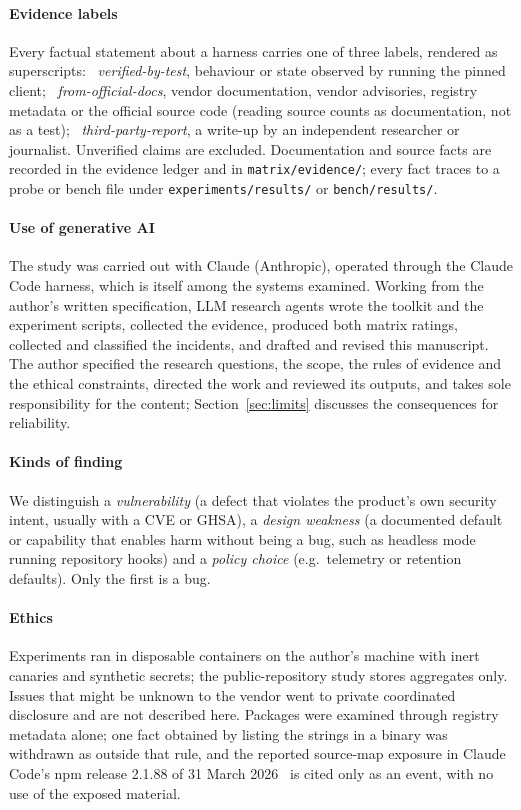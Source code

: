 \paragraph*{Evidence labels} Every factual statement about a harness carries one of three labels, rendered as superscripts:
\evT~\emph{verified-by-test}, behaviour or state observed by running the pinned client;
\evD~\emph{from-official-docs}, vendor documentation, vendor advisories, registry metadata or the official source code (reading source counts as documentation, not as a test);
\evTP~\emph{third-party-report}, a write-up by an independent researcher or journalist.
Unverified claims are excluded. Documentation and source facts are recorded in the evidence ledger and in \texttt{matrix/evidence/}; every \evT{} fact traces to a probe or bench file under \texttt{experiments/results/} or \texttt{bench/results/}.

\paragraph*{Use of generative AI} The study was carried out with Claude (Anthropic), operated through the Claude Code harness, which is itself among the systems examined. Working from the author's written specification, LLM research agents wrote the \tool{} toolkit and the experiment scripts, collected the evidence, produced both matrix ratings, collected and classified the incidents, and drafted and revised this manuscript. The author specified the research questions, the scope, the rules of evidence and the ethical constraints, directed the work and reviewed its outputs, and takes sole responsibility for the content; Section~\ref{sec:limits} discusses the consequences for reliability.

\paragraph*{Kinds of finding} We distinguish a \emph{vulnerability} (a defect that violates the product's own security intent, usually with a CVE or GHSA), a \emph{design weakness} (a documented default or capability that enables harm without being a bug, such as headless mode running repository hooks) and a \emph{policy choice} (e.g.\ telemetry or retention defaults). Only the first is a bug.

\paragraph*{Ethics} Experiments ran in disposable containers on the author's machine with inert canaries and synthetic secrets; the public-repository study stores aggregates only. Issues that might be unknown to the vendor went to private coordinated disclosure and are not described here. Packages were examined through registry metadata alone; one fact obtained by listing the strings in a binary was withdrawn as outside that rule, and the reported source-map exposure in Claude Code's npm release 2.1.88 of 31 March 2026\evTP~\cite{cc_sourcemap2026} is cited only as an event, with no use of the exposed material.
